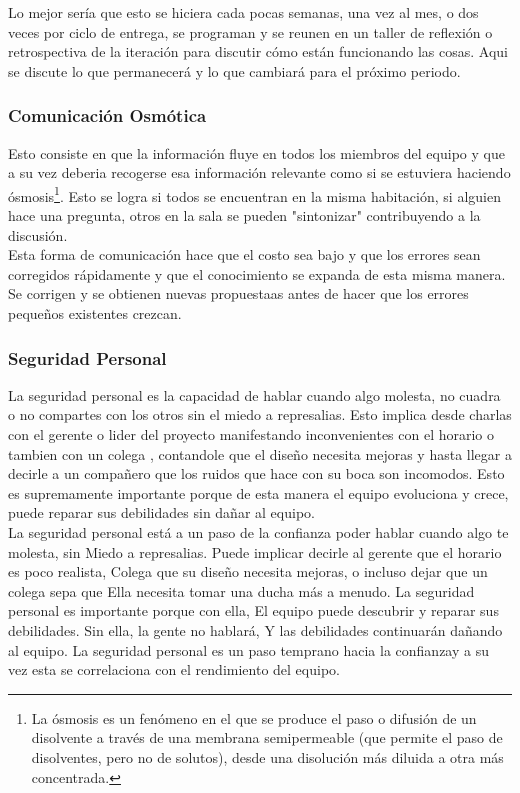 Lo mejor sería que esto se hiciera cada pocas semanas, una vez al mes, o dos veces por ciclo de entrega, se programan y se reunen en un taller de reflexión o retrospectiva de la iteración para discutir cómo están funcionando las cosas. Aqui se discute lo que permanecerá y lo que cambiará para el próximo periodo. 

\subsubsection{Comunicación Osmótica}
Esto consiste en que la información fluye en todos los miembros del equipo y que a su vez deberia recogerse esa información relevante como si se estuviera haciendo ósmosis\footnote{La ósmosis es un fenómeno en el que se produce el paso o difusión de un disolvente a través de una membrana semipermeable (que permite el paso de disolventes, pero no de solutos), desde una disolución más diluida a otra más concentrada.}. Esto se logra si todos se encuentran en la misma habitación, si alguien hace una pregunta, otros en la sala se pueden "sintonizar" contribuyendo a la discusión.\\

Esta forma de comunicación hace que el costo sea bajo y que los errores sean corregidos rápidamente y que el conocimiento se expanda de esta misma manera. Se corrigen y se obtienen nuevas propuestaas antes de hacer que los errores pequeños existentes crezcan.

\subsubsection{Seguridad Personal}
La seguridad personal es la capacidad de hablar cuando algo molesta, no cuadra o no compartes con los otros sin el miedo a represalias. Esto implica desde charlas con el gerente o lider del proyecto manifestando inconvenientes con el horario o tambien con un colega , contandole que el diseño necesita mejoras y hasta llegar a decirle a un compañero que los ruidos que hace con su boca son incomodos. Esto es supremamente importante porque de esta manera el equipo evoluciona y crece, puede reparar sus debilidades sin dañar al equipo.\\

La seguridad personal está a un paso de la confianza poder hablar cuando algo te molesta, sin
Miedo a represalias. Puede implicar decirle al gerente que el horario es poco realista,
Colega que su diseño necesita mejoras, o incluso dejar que un colega sepa que
Ella necesita tomar una ducha más a menudo. La seguridad personal es importante porque con ella,
El equipo puede descubrir y reparar sus debilidades. Sin ella, la gente no hablará,
Y las debilidades continuarán dañando al equipo.
La seguridad personal es un paso temprano hacia la confianzay a su vez esta se correlaciona con el rendimiento del equipo.
